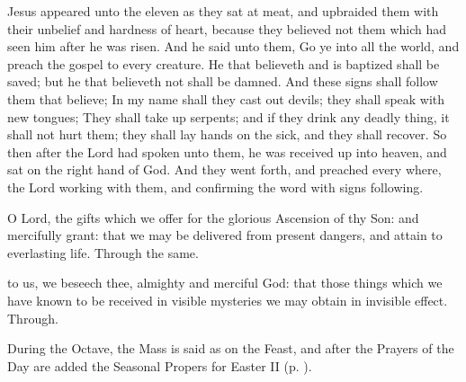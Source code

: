 
 Jesus appeared unto the eleven as they sat at meat, and upbraided them with their unbelief and hardness of heart, because they believed not them which had seen him after he was risen. And he said unto them, Go ye into all the world, and preach the gospel to every creature. He that believeth and is baptized shall be saved; but he that believeth not shall be damned. And these signs shall follow them that believe; In my name shall they cast out devils; they shall speak with new tongues; They shall take up serpents; and if they drink any deadly thing, it shall not hurt them; they shall lay hands on the sick, and they shall recover. So then after the Lord had spoken unto them, he was received up into heaven, and sat on the right hand of God. And they went forth, and preached every where, the Lord working with them, and confirming the word with signs following.


\secret\label{AscensionSecret}
 O Lord, the gifts which we offer for the glorious Ascension of thy Son: and mercifully grant: that we may be delivered from present dangers, and attain to everlasting life. Through the same.


\postcommunion\label{AscensionPostcommunion}
 to us, we beseech thee, almighty and merciful God: that those things which we have known to be received in visible mysteries we may obtain in invisible effect. Through.
\begin{rubric}
    During the Octave, the Mass is said as on the Feast, and after the Prayers of the Day are added the Seasonal Propers for Easter II (p. \pageref{EasterII}).
\end{rubric}


